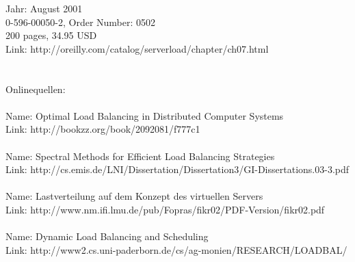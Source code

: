 \documentclass[12p]{article}
\begin{document}
	Jahr:     August 2001\\
	0-596-00050-2, Order Number: 0502\\
	200 pages, 34.95 USD\\
	Link: http://oreilly.com/catalog/serverload/chapter/ch07.html\\
	\\
	\\
	Onlinequellen:\\
	\\
	Name:    Optimal Load Balancing in Distributed Computer Systems\\
	Link:    http://bookzz.org/book/2092081/f777c1\\
	\\
	Name:    Spectral Methods for Efficient Load Balancing Strategies\\
	Link:    http://cs.emis.de/LNI/Dissertation/Dissertation3/GI-Dissertations.03-3.pdf\\
	\\
	Name:    Lastverteilung auf dem Konzept des virtuellen Servers\\
	Link:    http://www.nm.ifi.lmu.de/pub/Fopras/fikr02/PDF-Version/fikr02.pdf\\
	\\
	Name: Dynamic Load Balancing and Scheduling\\
	Link: http://www2.cs.uni-paderborn.de/cs/ag-monien/RESEARCH/LOADBAL/\\
	\\
	
\end{document}
